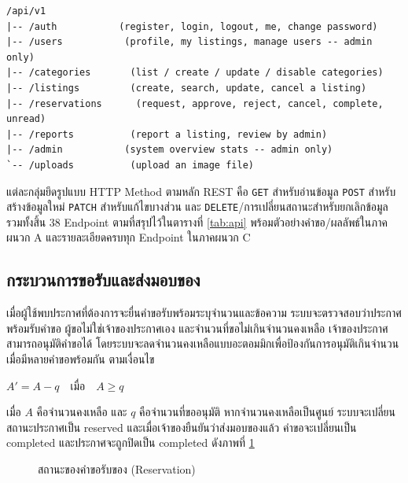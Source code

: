 \documentclass[12pt,a4paper]{report}
\begin{document}
\begin{lstlisting}
/api/v1
|-- /auth           (register, login, logout, me, change password)
|-- /users           (profile, my listings, manage users -- admin only)
|-- /categories       (list / create / update / disable categories)
|-- /listings         (create, search, update, cancel a listing)
|-- /reservations      (request, approve, reject, cancel, complete, unread)
|-- /reports          (report a listing, review by admin)
|-- /admin           (system overview stats -- admin only)
`-- /uploads          (upload an image file)
\end{lstlisting}

แต่ละกลุ่มยึดรูปแบบ HTTP Method ตามหลัก REST คือ \texttt{GET} สำหรับอ่านข้อมูล \texttt{POST} สำหรับสร้างข้อมูลใหม่ \texttt{PATCH} สำหรับแก้ไขบางส่วน และ \texttt{DELETE}/การเปลี่ยนสถานะสำหรับยกเลิกข้อมูล รวมทั้งสิ้น 38 Endpoint ตามที่สรุปไว้ในตารางที่ \ref{tab:api} พร้อมตัวอย่างคำขอ/ผลลัพธ์ในภาคผนวก A และรายละเอียดครบทุก Endpoint ในภาคผนวก C

\subsection{กระบวนการขอรับและส่งมอบของ}

เมื่อผู้ใช้พบประกาศที่ต้องการจะยื่นคำขอรับพร้อมระบุจำนวนและข้อความ ระบบจะตรวจสอบว่าประกาศพร้อมรับคำขอ ผู้ขอไม่ใช่เจ้าของประกาศเอง และจำนวนที่ขอไม่เกินจำนวนคงเหลือ เจ้าของประกาศสามารถอนุมัติคำขอได้ โดยระบบจะลดจำนวนคงเหลือแบบอะตอมมิกเพื่อป้องกันการอนุมัติเกินจำนวนเมื่อมีหลายคำขอพร้อมกัน ตามเงื่อนไข
\begin{center}
$ A' = A - q \quad \text{เมื่อ} \quad A \geq q $
\end{center}
เมื่อ $A$ คือจำนวนคงเหลือ และ $q$ คือจำนวนที่ขออนุมัติ หากจำนวนคงเหลือเป็นศูนย์ ระบบจะเปลี่ยนสถานะประกาศเป็น reserved และเมื่อเจ้าของยืนยันว่าส่งมอบของแล้ว คำขอจะเปลี่ยนเป็น completed และประกาศจะถูกปิดเป็น completed ดังภาพที่ \ref{fig:flow}

\begin{figure}[htbp]
\centering
{}
\caption{สถานะของคำขอรับของ (Reservation)}
\label{fig:flow}
\end{figure}
\end{document}
